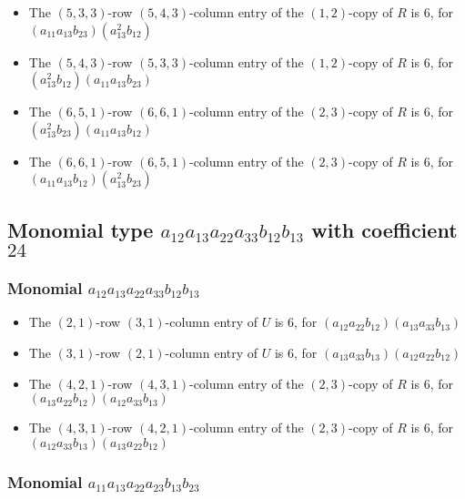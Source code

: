 \documentclass{article}
\begin{document}
\begin{itemize}
\item The $(5, 3, 3)$-row $(5, 4, 3)$-column entry of the $ \left(1, 2\right) $-copy of $R$ is $ 6 $, for $( a_{11} a_{13} b_{23} )( a_{13}^{2} b_{12} )$ 
\item The $(5, 4, 3)$-row $(5, 3, 3)$-column entry of the $ \left(1, 2\right) $-copy of $R$ is $ 6 $, for $( a_{13}^{2} b_{12} )( a_{11} a_{13} b_{23} )$ 
\item The $(6, 5, 1)$-row $(6, 6, 1)$-column entry of the $ \left(2, 3\right) $-copy of $R$ is $ 6 $, for $( a_{13}^{2} b_{23} )( a_{11} a_{13} b_{12} )$ 
\item The $(6, 6, 1)$-row $(6, 5, 1)$-column entry of the $ \left(2, 3\right) $-copy of $R$ is $ 6 $, for $( a_{11} a_{13} b_{12} )( a_{13}^{2} b_{23} )$ 
\end{itemize}
\subsection{Monomial type $ a_{12} a_{13} a_{22} a_{33} b_{12} b_{13} $ with coefficient $ 24 $}

\subsubsection{Monomial $ a_{12} a_{13} a_{22} a_{33} b_{12} b_{13} $}

\begin{itemize}
\item The $ \left(2, 1\right) $-row $ \left(3, 1\right) $-column entry of $U$ is $ 6 $, for $( a_{12} a_{22} b_{12} )( a_{13} a_{33} b_{13} )$ 
\item The $ \left(3, 1\right) $-row $ \left(2, 1\right) $-column entry of $U$ is $ 6 $, for $( a_{13} a_{33} b_{13} )( a_{12} a_{22} b_{12} )$ 
\item The $(4, 2, 1)$-row $(4, 3, 1)$-column entry of the $ \left(2, 3\right) $-copy of $R$ is $ 6 $, for $( a_{13} a_{22} b_{12} )( a_{12} a_{33} b_{13} )$ 
\item The $(4, 3, 1)$-row $(4, 2, 1)$-column entry of the $ \left(2, 3\right) $-copy of $R$ is $ 6 $, for $( a_{12} a_{33} b_{13} )( a_{13} a_{22} b_{12} )$ 
\end{itemize}
\subsubsection{Monomial $ a_{11} a_{13} a_{22} a_{23} b_{13} b_{23} $}
\end{document}

